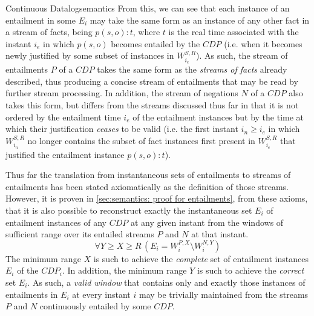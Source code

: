 \begin{nestedsection}{Continuous Datalog}{semantics}
	From this, we can see that each instance of an entailment in some $E_{i}$ may take the same form as an instance of any other fact in a stream of facts, being ${p(s,o):t}$, where $t$ is the real time associated with the instant $i_{e}$ in which ${p(s,o)}$ becomes entailed by the ${CDP}$
	(i.e. when it becomes newly justified by some subset of instances in $W^{S,R}_{i_{e}}$).
	As such, the stream of entailments $P$ of a ${CDP}$ takes the same form as the \emph{streams of facts} already described, thus producing a concise stream of entailments that may be read by further stream processing.
	In addition, the stream of negations $N$ of a ${CDP}$ also takes this form, but differs from the streams discussed thus far in that it is not ordered by the entailment time $i_{e}$ of the entailment instances but by the time at which their justification \emph{ceases} to be valid
	(i.e. the first instant ${i_{n} \geq i_{e}}$ in which $W^{S,R}_{i_{n}}$ no longer contains the subset of fact instances first present in $W^{S,R}_{i_{e}}$ that justified the entailment instance ${p(s,o):t}$).

	Thus far the translation from instantaneous sets of entailments to streams of entailments has been stated axiomatically as the definition of those streams.
	However, it is proven in \ref{sec:semantics: proof for entailments}, from these axioms, that it is also possible to reconstruct exactly the instantaneous set $E_{i}$ of entailment instances of any ${CDP}$ at any given instant from the windows of sufficient range over its entailed streams $P$ and $N$ at that instant.
	\[ \forall Y \geq X \geq R \, \left( E_{i} = W^{P,X}_{i} \setminus W^{N,Y}_{i} \right) \]
	The minimum range $X$ is such to achieve the \emph{complete} set of entailment instances $E_{i}$ of the ${CDP}_{i}$.
	In addition, the minimum range $Y$ is such to achieve the \emph{correct} set $E_{i}$.
	As such, a \emph{valid window} that contains only and exactly those instances of entailments in $E_{i}$ at every instant $i$ may be trivially maintained from the streams $P$ and $N$ continuously entailed by some ${CDP}$.
\end{nestedsection}